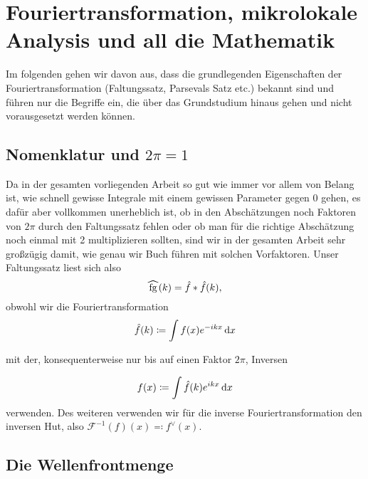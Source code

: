 
\section{Fouriertransformation, mikrolokale Analysis und all die Mathematik} %
\label{sec:fouriertransformation_mikrolokale_analysis_und_all_die_mathematik}
Im folgenden gehen wir davon aus, dass die grundlegenden Eigenschaften der Fouriertransformation (Faltungssatz, Parsevals Satz etc.) bekannt sind und führen nur die Begriffe ein, die über das Grundstudium hinaus gehen und nicht vorausgesetzt werden können.

\subsection{Nomenklatur und \texorpdfstring{$2 \pi = 1$}{2 Pi = 1}}
Da in der gesamten vorliegenden Arbeit so gut wie immer vor allem von Belang ist, wie schnell gewisse Integrale mit einem gewissen Parameter gegen 0 gehen, es dafür aber vollkommen unerheblich ist, ob in den Abschätzungen noch Faktoren von $2 \pi$ durch den Faltungssatz fehlen oder ob man für die richtige Abschätzung noch einmal mit 2 multiplizieren  sollten, sind wir in der gesamten Arbeit sehr großzügig damit, wie genau wir Buch führen mit solchen Vorfaktoren. Unser Faltungssatz liest sich also
\begin{equation*}
    \rwhat{fg} (k) = \hat f \ast \hat f (k),
\end{equation*}
obwohl wir die Fouriertransformation
\begin{equation*}
    \hat f (k) \coloneqq \int f(x)e^{-ikx} \mathop{}\!\mathrm{d} x
\end{equation*}

mit der, konsequenterweise nur bis auf einen Faktor $2 \pi$, Inversen

\begin{equation*}
    f (x) \coloneqq \int \hat f(k)e^{ikx} \mathop{}\!\mathrm{d} x
\end{equation*}
verwenden. Des weiteren verwenden wir für die inverse Fouriertransformation den inversen Hut, also $\mathcal{F}^{-1}(f)(x) \eqqcolon f^\vee (x)$.


\subsection{Die Wellenfrontmenge}

